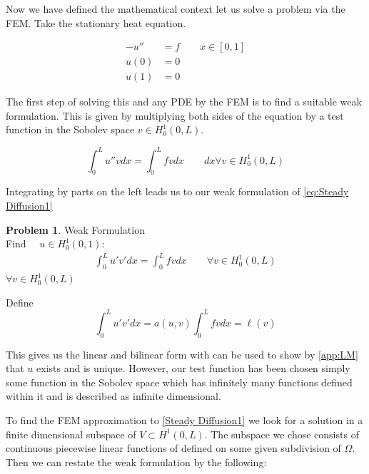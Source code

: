 \documentclass{uonmathreport}
\theoremstyle{definition}
\theoremstyle{problem}
\newtheorem{problem}{Problem}[section]
\theoremstyle{theorem}
\begin{document}
Now we have defined the mathematical context let us solve a problem via the FEM. Take the stationary heat equation.

\begin{subequations} 
\label{eq:Steady Diffusion1} 
\begin{align}
-u'' &= f		\quad \quad  x \in [0, 1] \\  	
u(0) &= 0 \\
u(1) &= 0
\end{align}
\end{subequations}

The first step of solving this and any PDE by the FEM is to find a suitable weak formulation. This is given by multiplying both sides of the equation by a test function in the Sobolev space $v \in H^1_0(0, L)$.

\begin{equation*}
\int_0^L  u'' v  dx = \int_0^L  f v dx 	\quad \quad  dx \forall v \in H^1_0(0, L)
\end{equation*}

Integrating by parts on the left leads us to our weak formulation of \ref{eq:Steady Diffusion1}

\begin{problem}{Weak Formulation} \label{prob:Weak Formulation Elliptic}
\\Find $\quad u \in H^1_0(0, 1)$:
\begin{align*}
\int_0^L  u' v'  dx =   \int_0^L  f v dx  \quad \quad  \forall v \in H^1_0(0, L)
\end{align*}
$\forall v \in H^1_0(0, L)$
\end{problem}

Define 
\begin{equation*}
\int_0^L  u' v'  dx = a(u, v)  	
\int_0^L  f v dx  =  \ell(v)
\end{equation*}

This gives us the linear and bilinear form with can be used to show by \ref{app:LM} that $u$ exists and is unique. However, our test function has been chosen simply some function in the Sobolev space which has infinitely many functions defined within it and is described as infinite dimensional. 

To find the FEM approximation to \ref{Steady Diffusion1} we look for a solution in a finite dimensional subspace of $V\subset H^1(0, L) $. The subspace we chose consists of continuous piecewise linear functions of defined on some given subdivision of $\Omega$. Then we can restate the weak formulation by the following:
\end{document}

